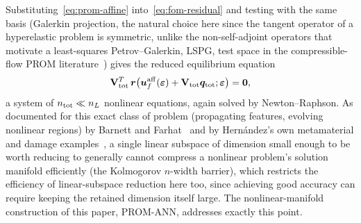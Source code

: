 \documentclass[10pt,a4paper]{article}
\begin{document}
Substituting~\eqref{eq:prom-affine} into~\eqref{eq:fom-residual}
and testing with the same basis (Galerkin projection, the natural choice
here since the tangent operator of a hyperelastic problem is symmetric,
unlike the non-self-adjoint operators that motivate a least-squares
Petrov--Galerkin, LSPG, test space in the compressible-flow PROM
literature~\cite{Barnett2023,AresDeParga2026}) gives the reduced equilibrium
equation
\begin{equation}
\label{eq:prom-residual}
 \mathbf V_{\rm tot}^T\,\bm r\big(\bm u_f^{\rm aff}(\bm\varepsilon)+\mathbf V_{\rm tot}\bm q_{\rm tot};\bm\varepsilon\big)=\bm 0,
\end{equation}
a system of $n_{\rm tot}\ll n_L$ nonlinear equations, again solved by
Newton--Raphson. As documented for this exact class of problem
(propagating features, evolving nonlinear regions) by
Barnett and Farhat~\cite{Barnett2022} and by Hern\'andez's own metamaterial and
damage examples~\cite{HernandezMAWECM}, a single linear subspace
of dimension small enough to be worth reducing to generally cannot
compress a nonlinear problem's solution manifold efficiently (the
Kolmogorov $n$-width barrier), which restricts the efficiency of
linear-subspace reduction here too, since achieving good accuracy can
require keeping the retained dimension itself large. The
nonlinear-manifold construction of
this paper, PROM-ANN, addresses exactly this point.
\end{document}
